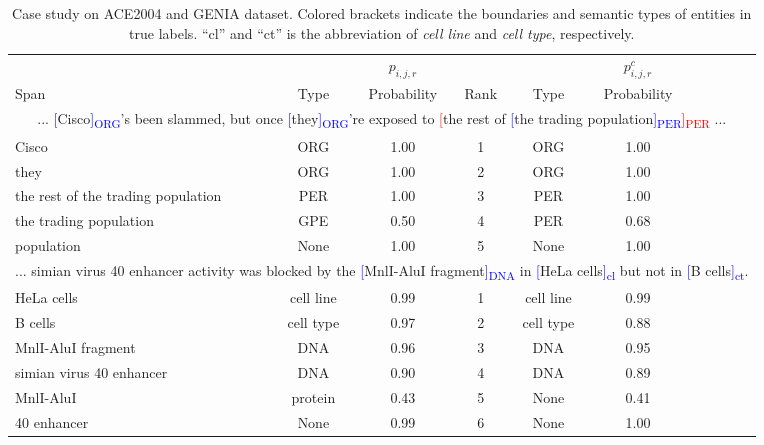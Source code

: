 \documentclass[11pt]{article}
\begin{document}
\begin{table*}[ht]
\small
\centering
\begin{tabular}{p{6cm}ccccccccc}
\toprule
&& $p_{i,j,r}$ & & & $p_{i,j,r}^c$ \\
Span & Type & Probability& Rank & Type & Probability &&&&\\
\midrule
\multicolumn{10}{c}{... \textcolor{blue}{[}Cisco\textcolor{blue}{]\textsubscript{ORG}}'s been slammed, but once \textcolor{blue}{[}they\textcolor{blue}{]\textsubscript{ORG}}'re exposed to \textcolor{red}{[}the rest of \textcolor{blue}{[}the trading population\textcolor{blue}{]\textsubscript{PER}}\textcolor{red}{]\textsubscript{PER}} ...}\\
\midrule
Cisco & ORG &1.00 &1& ORG & 1.00 \\
they & ORG &1.00&2& ORG & 1.00 \\
the rest of the trading population & PER &1.00 &3& PER & 1.00 \\
the trading population & GPE & 0.50 &4& PER & 0.68 \\
population & None  & 1.00 &5& None  & 1.00 \\
\midrule
\multicolumn{10}{c}{... simian virus 40 enhancer activity was blocked by the \textcolor{blue}{[}MnlI-AluI fragment\textcolor{blue}{]\textsubscript{DNA}} in \textcolor{blue}{[}HeLa cells\textcolor{blue}{]\textsubscript{cl}} but not in \textcolor{blue}{[}B cells\textcolor{blue}{]\textsubscript{ct}}.}\\
\midrule
HeLa cells & cell line & 0.99 &1& cell line & 0.99 \\
B cells & cell type & 0.97 &2& cell type & 0.88 \\
MnlI-AluI fragment & DNA & 0.96 &3& DNA & 0.95 \\
simian virus 40 enhancer & DNA & 0.90 &4& DNA & 0.89  \\
MnlI-AluI & protein & 0.43 &5& None & 0.41 \\
40 enhancer & None & 0.99 &6& None & 1.00 \\
\bottomrule
\end{tabular}
\centering
\caption{Case study on ACE2004 and GENIA dataset.
Colored brackets indicate the boundaries and semantic types of entities in true labels. ``cl'' and ``ct'' is the abbreviation of \textit{cell line} and \textit{cell type}, respectively. }
\label{table:ex2}
\end{table*}
\end{document}
